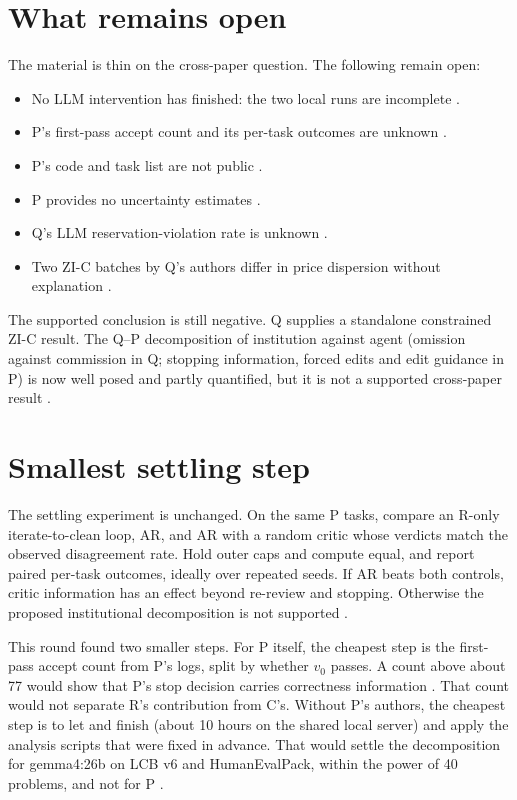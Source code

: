 \documentclass{article}
\begin{document}
\section{What remains open}
The material is thin on the cross-paper question. The following remain open:
\begin{itemize}
\item No LLM intervention has finished: the two local runs are incomplete .
\item P's first-pass accept count and its per-task outcomes are unknown .
\item P's code and task list are not public .
\item P provides no uncertainty estimates .
\item Q's LLM reservation-violation rate is unknown .
\item Two ZI-C batches by Q's authors differ in price dispersion without explanation .
\end{itemize}
The supported conclusion is still negative. Q supplies a standalone constrained ZI-C result. The Q--P decomposition of institution against agent (omission against commission in Q; stopping information, forced edits and edit guidance in P) is now well posed and partly quantified, but it is not a supported cross-paper result .

\section{Smallest settling step}
The settling experiment is unchanged. On the same P tasks, compare an R-only iterate-to-clean loop, AR, and AR with a random critic whose verdicts match the observed disagreement rate. Hold outer caps and compute equal, and report paired per-task outcomes, ideally over repeated seeds. If AR beats both controls, critic information has an effect beyond re-review and stopping. Otherwise the proposed institutional decomposition is not supported .

This round found two smaller steps. For P itself, the cheapest step is the first-pass accept count from P's logs, split by whether \(v_0\) passes. A count above about 77 would show that P's stop decision carries correctness information . That count would not separate R's contribution from C's. Without P's authors, the cheapest step is to let  and  finish (about 10 hours on the shared local server) and apply the analysis scripts that were fixed in advance. That would settle the decomposition for gemma4:26b on LCB v6 and HumanEvalPack, within the power of 40 problems, and not for P .
\end{document}
